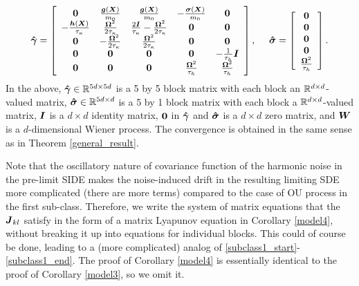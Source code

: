 \begin{corollary}
\begin{equation}
\boldsymbol{\hat{\gamma}} = \left[ \begin{array}{ccccc}
\vecc{0}  & \frac{\vecc{g}(\vecc{X}) }{m_{0}} & \frac{\vecc{g}(\vecc{X})}{m_{0}} & -\frac{\vecc{\sigma}(\vecc{X}) }{m_{0}} & \vecc{0}  \\
-\frac{\vecc{h}(\vecc{X}) }{\tau_{\kappa}} & \frac{\vecc{\Omega}^2}{2 \tau_{\kappa}} & \frac{2 \vecc{I}}{\tau_{\kappa}} - \frac{\vecc{\Omega}^2}{2 \tau_{\kappa}} & \vecc{0}  & \vecc{0}  \\ 
\vecc{0}  & -\frac{\vecc{\Omega}^2}{2 \tau_{\kappa}} & \frac{\vecc{\Omega}^2}{2 \tau_{\kappa}} & \vecc{0}  & \vecc{0}  \\ 
\vecc{0}  & \vecc{0}  & \vecc{0}  & \vecc{0}  & -\frac{1}{\tau_{h}} \vecc{I} \\
\vecc{0}  & \vecc{0}  & \vecc{0}  & \frac{\vecc{\Omega}^2}{\tau_{h}} & \frac{\vecc{\Omega}^2}{\tau_{h}}   \end{array} \right], \ \ \ \ 
 \vecc{\hat{\sigma}} = 
         \left[ \begin{array}{c}
\vecc{0}   \\
\vecc{0}   \\
\vecc{0}  \\
\vecc{0}   \\
\frac{\vecc{\Omega}^2}{\tau_{h}}  \end{array} \right]. \end{equation}
In the above,  $\boldsymbol{\hat{\gamma}} \in \mathbb{R}^{5d \times 5d}$ is a 5 by 5 block matrix with each block an $\mathbb{R}^{d \times d}$-valued matrix, $ \boldsymbol{\hat{\sigma}} \in \mathbb{R}^{5d \times d}$ is a 5 by 1 block matrix  with each block a $\mathbb{R}^{d \times d}$-valued matrix, $\boldsymbol{I}$ is a $d \times d$ identity matrix,  $\boldsymbol{0}$ in $\boldsymbol{\hat{\gamma}}$ and $\boldsymbol{\hat{\sigma}}$  is a $d \times d$ zero matrix,  and $\boldsymbol{W}$ is a $d$-dimensional Wiener process. 
The convergence is obtained in the same sense as in Theorem \ref{general_result}. 
\end{corollary}

Note that the oscillatory nature of covariance function of the harmonic noise in the pre-limit SIDE makes the noise-induced drift in the resulting limiting SDE more complicated (there are more terms) compared to the case of OU process in the first sub-class. Therefore, we write the system of matrix equations that the $\boldsymbol{J}_{kl}$ satisfy in the form of a matrix Lyapunov equation in Corollary \ref{model4}, without breaking it up into equations for individual blocks. This could of course be done, leading to a (more complicated) analog of \eqref{subclass1_start}-\eqref{subclass1_end}. The proof of Corollary \ref{model4}  is essentially identical to the proof of Corollary \ref{model3}, so we omit it.  

